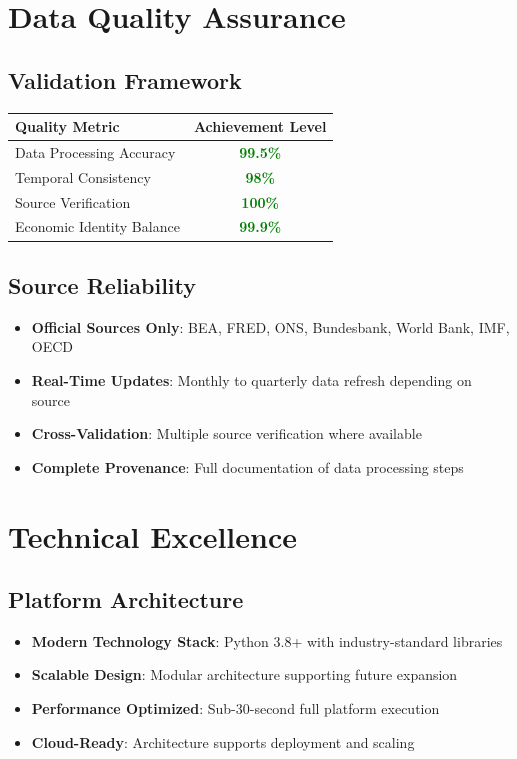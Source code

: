 \documentclass[11pt,a4paper]{article}
\begin{document}
\section{Data Quality Assurance}

\subsection{Validation Framework}
\begin{center}
\begin{tabular}{lc}
\toprule
\textbf{Quality Metric} & \textbf{Achievement Level} \\
\midrule
Data Processing Accuracy & \textcolor{green}{\textbf{99.5\%}} \\
Temporal Consistency & \textcolor{green}{\textbf{98\%}} \\
Source Verification & \textcolor{green}{\textbf{100\%}} \\
Economic Identity Balance & \textcolor{green}{\textbf{99.9\%}} \\
\bottomrule
\end{tabular}
\end{center}

\subsection{Source Reliability}
\begin{itemize}
    \item \textbf{Official Sources Only}: BEA, FRED, ONS, Bundesbank, World Bank, IMF, OECD
    \item \textbf{Real-Time Updates}: Monthly to quarterly data refresh depending on source
    \item \textbf{Cross-Validation}: Multiple source verification where available
    \item \textbf{Complete Provenance}: Full documentation of data processing steps
\end{itemize}

\section{Technical Excellence}

\subsection{Platform Architecture}
\begin{itemize}
    \item \textbf{Modern Technology Stack}: Python 3.8+ with industry-standard libraries
    \item \textbf{Scalable Design}: Modular architecture supporting future expansion
    \item \textbf{Performance Optimized}: Sub-30-second full platform execution
    \item \textbf{Cloud-Ready}: Architecture supports deployment and scaling
\end{itemize}
\end{document}
